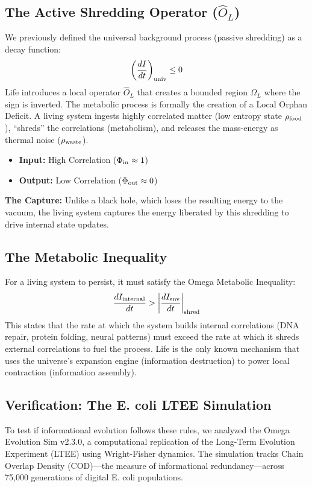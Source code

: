 \documentclass{article}
\begin{document}
\subsection{The Active Shredding Operator ($\hat{O}_L$)}
We previously defined the universal background process (passive shredding) as a decay function:
\begin{equation}
    \left( \frac{dI}{dt} \right)_{\rm univ} \le 0
\end{equation}
Life introduces a local operator $\hat{O}_L$ that creates a bounded region $\Omega_L$ where the sign is inverted. The metabolic process is formally the creation of a Local Orphan Deficit.
A living system ingests highly correlated matter (low entropy state $\rho_{\rm food}$), ``shreds'' the correlations (metabolism), and releases the mass-energy as thermal noise ($\rho_{\rm waste}$).
\begin{itemize}
    \item \textbf{Input:} High Correlation ($\Phi_{\rm in} \approx 1$)
    \item \textbf{Output:} Low Correlation ($\Phi_{\rm out} \approx 0$)
\end{itemize}
\textbf{The Capture:} Unlike a black hole, which loses the resulting energy to the vacuum, the living system captures the energy liberated by this shredding to drive internal state updates.

\subsection{The Metabolic Inequality}
For a living system to persist, it must satisfy the Omega Metabolic Inequality:
\begin{equation}
    \frac{dI_{\rm internal}}{dt} > \left| \frac{dI_{\rm env}}{dt} \right|_{\rm shred}
\end{equation}
This states that the rate at which the system builds internal correlations (DNA repair, protein folding, neural patterns) must exceed the rate at which it shreds external correlations to fuel the process. Life is the only known mechanism that uses the universe's expansion engine (information destruction) to power local contraction (information assembly).

\subsection{Verification: The E. coli LTEE Simulation}
To test if informational evolution follows these rules, we analyzed the Omega Evolution Sim v2.3.0, a computational replication of the Long-Term Evolution Experiment (LTEE) using Wright-Fisher dynamics.
The simulation tracks Chain Overlap Density (COD)—the measure of informational redundancy—across 75,000 generations of digital E. coli populations.
\end{document}
